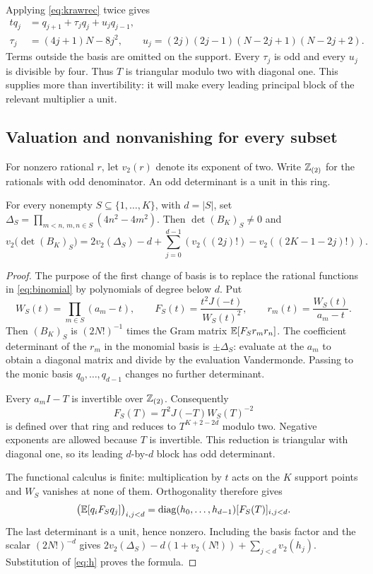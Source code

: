Applying \eqref{eq:krawrec} twice gives
\begin{align}
 tq_j&=q_{j+1}+\tau_jq_j+u_jq_{j-1},\label{eq:Trec}\\
 \tau_j&=(4j+1)N-8j^2,\qquad
 u_j=(2j)(2j-1)(N-2j+1)(N-2j+2).\nonumber
\end{align}
Terms outside the basis are omitted on the support. Every $\tau_j$ is
odd and every $u_j$ is divisible by four. Thus $T$ is triangular modulo
two with diagonal one. This supplies more than invertibility: it will
make every leading principal block of the relevant multiplier a unit.

\subsection{Valuation and nonvanishing for every subset}
For nonzero rational $r$, let $v_2(r)$ denote its exponent of two.
Write $\mathbb Z_{(2)}$ for the rationals with odd denominator. An odd
determinant is a unit in this ring.

\begin{theorem}\label{thm:valuation}
For every nonempty $S\subseteq\{1,\ldots,K\}$, with $d=|S|$, set
$\Delta_S=\prod_{m<n,\,m,n\in S}(4n^2-4m^2)$. Then
$\det(B_K)_S\ne0$ and
\begin{equation}\label{eq:valuation}
 v_2\bigl(\det(B_K)_S\bigr)
 =2v_2(\Delta_S)-d+
 \sum_{j=0}^{d-1}\left(v_2((2j)!)-v_2((2K-1-2j)!)\right).
\end{equation}
\end{theorem}
\begin{proof}
The purpose of the first change of basis is to replace the rational
functions in \eqref{eq:binomial} by polynomials of degree below $d$.
Put
\[
 W_S(t)=\prod_{m\in S}(a_m-t),\qquad
 F_S(t)=\frac{t^2J(-t)}{W_S(t)^2},\qquad
 r_m(t)=\frac{W_S(t)}{a_m-t}.
\]
Then $(B_K)_S$ is $(2N!)^{-1}$ times the Gram matrix
$\mathbb E[F_Sr_mr_n]$. The coefficient determinant of the $r_m$ in the
monomial basis is $\pm\Delta_S$: evaluate at the $a_m$ to obtain a
diagonal matrix and divide by the evaluation Vandermonde. Passing to
the monic basis $q_0,\ldots,q_{d-1}$ changes no further determinant.

Every $a_mI-T$ is invertible over $\mathbb Z_{(2)}$. Consequently
\[
 F_S(T)=T^2J(-T)W_S(T)^{-2}
\]
is defined over that ring and reduces to $T^{K+2-2d}$ modulo two.
Negative exponents are allowed because $T$ is invertible. This
reduction is triangular with diagonal one, so its leading $d$-by-$d$
block has odd determinant.

The functional calculus is finite: multiplication by $t$ acts on the
$K$ support points and $W_S$ vanishes at none of them. Orthogonality
therefore gives
\[
 \bigl(\mathbb E[q_iF_Sq_j]\bigr)_{i,j<d}
 =\operatorname{diag}(h_0,\ldots,h_{d-1})[F_S(T)]_{i,j<d}.
\]
The last determinant is a unit, hence nonzero. Including the basis
factor and the scalar $(2N!)^{-d}$ gives
$2v_2(\Delta_S)-d(1+v_2(N!))+\sum_{j<d}v_2(h_j)$.
Substitution of \eqref{eq:h} proves the formula.
\end{proof}

